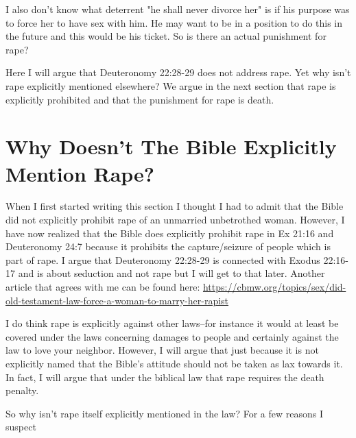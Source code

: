 \documentclass[11pt]{article}
\begin{document}
I also don't know what deterrent "he shall never divorce her" is if his purpose was to force her to have sex with him. He may want to be in a position to do this in the future and this would be his ticket.
So is there an actual punishment for rape?

Here I will argue that Deuteronomy 22:28-29 does not address rape. Yet why isn't rape explicitly mentioned elsewhere? We argue in the next section that rape is explicitly prohibited and that the punishment for rape is death.

\section{Why Doesn't The Bible Explicitly Mention Rape?} \label{bible mention rape}
 When I first started writing this section I thought I had to admit that the Bible did not explicitly prohibit rape of an unmarried unbetrothed woman. However, I have now realized that the Bible does explicitly prohibit rape in Ex 21:16 and Deuteronomy 24:7 because it prohibits the capture/seizure of people which is part of rape. I argue that Deuteronomy 22:28-29 is connected with Exodus 22:16-17 and is about seduction and not rape but I will get to that later. Another article that agrees with me can be found here: \url{https://cbmw.org/topics/sex/did-old-testament-law-force-a-woman-to-marry-her-rapist}

I do think rape is explicitly against other laws–for instance it would at least be covered under the laws concerning damages to people and certainly against the law to love your neighbor. However, I will argue that just because it is not explicitly named that the Bible’s attitude should not be taken as lax towards it. In fact, I will argue that under the biblical law that rape requires the death penalty.

So why isn’t rape itself explicitly mentioned in the law? For a few reasons I suspect
\end{document}
